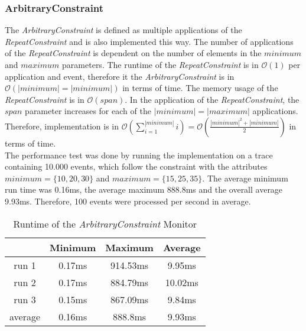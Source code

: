 \subsubsection{ArbitraryConstraint}
	The \emph{ArbitraryConstraint} is defined as multiple applications of the \emph{RepeatConstraint} and is also implemented this way. The number of applications of the \emph{RepeatConstraint} is dependent on the number of elements in the $minimum$ and $maximum$ parameters. The runtime of the \emph{RepeatConstraint} is in $\mathcal{O}(1)$ per application and event, therefore it the \emph{ArbitraryConstraint} is in $\mathcal{O}(|minimum|=|minimum|)$ in terms of time. The memory usage of the \emph{RepeatConstraint} is in $\mathcal{O}(span)$. In the application of the \emph{RepeatConstraint}, the $span$ parameter increases for each of the $|minimum| = |maximum|$ applications. Therefore, implementation is in $\mathcal{O}(\sum_{i=1}^{|minimum|}i)=\mathcal{O}(\frac{|minimum|^2+|minimum|}{2})$ in terms of time.\\
	The performance test was done by running the implementation on a trace containing 10.000 events, which follow the constraint with the attributes $minimum=\{10,20,30\}$ and $maximum=\{15,25,35\}$. The average minimum run time was 0.16ms, the average maximum 888.8ms and the overall average 9.93ms. Therefore, 100 events were processed per second in average.
	\begin{table}
		\begin{tabular}{|c|c|c|c|}
			\hline
					& Minimum & Maximum & Average \\
			\hline
			run 1	& 0.17ms & 914.53ms & 9.95ms \\
			\hline
			run 2	& 0.17ms & 884.79ms & 10.02ms\\
			\hline
			run 3	& 0.15ms & 867.09ms & 9.84ms\\
			\hline
			average & 0.16ms & 888.8ms & 9.93ms\\
			\hline
		\end{tabular}
		\centering
		\label{tab:runtimeArbitraryConstraint}
		\caption{Runtime of the \emph{ArbitraryConstraint} Monitor}
	\end{table}

